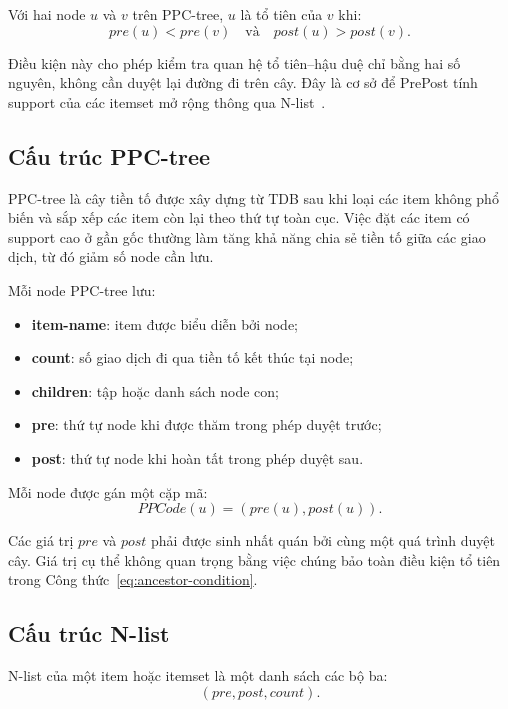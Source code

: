 Với hai node $u$ và $v$ trên PPC-tree, $u$ là tổ tiên của $v$ khi:
\begin{equation}
    pre(u) < pre(v)
    \quad\text{và}\quad
    post(u) > post(v).
    \label{eq:ancestor-condition}
\end{equation}

Điều kiện này cho phép kiểm tra quan hệ tổ tiên--hậu duệ chỉ bằng hai số nguyên,
không cần duyệt lại đường đi trên cây. Đây là cơ sở để PrePost tính support của
các itemset mở rộng thông qua N-list~\cite{deng2012prepost}.

\subsection{Cấu trúc PPC-tree}

PPC-tree là cây tiền tố được xây dựng từ TDB sau khi loại các item không phổ
biến và sắp xếp các item còn lại theo thứ tự toàn cục. Việc đặt các item có
support cao ở gần gốc thường làm tăng khả năng chia sẻ tiền tố giữa các giao
dịch, từ đó giảm số node cần lưu.

Mỗi node PPC-tree lưu:
\begin{itemize}
    \item \textbf{item-name}: item được biểu diễn bởi node;
    \item \textbf{count}: số giao dịch đi qua tiền tố kết thúc tại node;
    \item \textbf{children}: tập hoặc danh sách node con;
    \item \textbf{pre}: thứ tự node khi được thăm trong phép duyệt trước;
    \item \textbf{post}: thứ tự node khi hoàn tất trong phép duyệt sau.
\end{itemize}

Mỗi node được gán một cặp mã:
\begin{equation}
    PPCode(u)=(pre(u),post(u)).
    \label{eq:pp-code}
\end{equation}

Các giá trị $pre$ và $post$ phải được sinh nhất quán bởi cùng một quá trình
duyệt cây. Giá trị cụ thể không quan trọng bằng việc chúng bảo toàn điều kiện
tổ tiên trong Công thức~\eqref{eq:ancestor-condition}.

\subsection{Cấu trúc N-list}

N-list của một item hoặc itemset là một danh sách các bộ ba:
\begin{equation}
    (pre,post,count).
    \label{eq:nlist-entry}
\end{equation}

